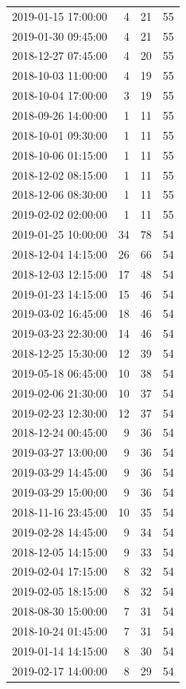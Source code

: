 \begin{tabular}{lrrr}
2019-01-15 17:00:00 & 4 & 21 & 55 \\
2019-01-30 09:45:00 & 4 & 21 & 55 \\
2018-12-27 07:45:00 & 4 & 20 & 55 \\
2018-10-03 11:00:00 & 4 & 19 & 55 \\
2018-10-04 17:00:00 & 3 & 19 & 55 \\
2018-09-26 14:00:00 & 1 & 11 & 55 \\
2018-10-01 09:30:00 & 1 & 11 & 55 \\
2018-10-06 01:15:00 & 1 & 11 & 55 \\
2018-12-02 08:15:00 & 1 & 11 & 55 \\
2018-12-06 08:30:00 & 1 & 11 & 55 \\
2019-02-02 02:00:00 & 1 & 11 & 55 \\
2019-01-25 10:00:00 & 34 & 78 & 54 \\
2018-12-04 14:15:00 & 26 & 66 & 54 \\
2018-12-03 12:15:00 & 17 & 48 & 54 \\
2019-01-23 14:15:00 & 15 & 46 & 54 \\
2019-03-02 16:45:00 & 18 & 46 & 54 \\
2019-03-23 22:30:00 & 14 & 46 & 54 \\
2018-12-25 15:30:00 & 12 & 39 & 54 \\
2019-05-18 06:45:00 & 10 & 38 & 54 \\
2019-02-06 21:30:00 & 10 & 37 & 54 \\
2019-02-23 12:30:00 & 12 & 37 & 54 \\
2018-12-24 00:45:00 & 9 & 36 & 54 \\
2019-03-27 13:00:00 & 9 & 36 & 54 \\
2019-03-29 14:45:00 & 9 & 36 & 54 \\
2019-03-29 15:00:00 & 9 & 36 & 54 \\
2018-11-16 23:45:00 & 10 & 35 & 54 \\
2019-02-28 14:45:00 & 9 & 34 & 54 \\
2018-12-05 14:15:00 & 9 & 33 & 54 \\
2019-02-04 17:15:00 & 8 & 32 & 54 \\
2019-02-05 18:15:00 & 8 & 32 & 54 \\
2018-08-30 15:00:00 & 7 & 31 & 54 \\
2018-10-24 01:45:00 & 7 & 31 & 54 \\
2019-01-14 14:15:00 & 8 & 30 & 54 \\
2019-02-17 14:00:00 & 8 & 29 & 54 \\

\end{tabular}
